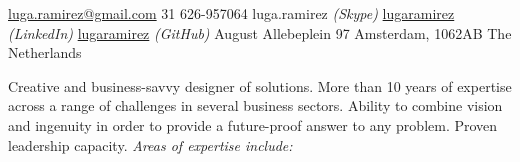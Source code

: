 \documentclass[10pt,a4paper]{article} %
\begin{document}
 



\noindent\href{mailto:luga.ramirez@gmail.com}{luga.ramirez@gmail.com}
\bull \textsmaller{+}31 626-957064
\bull luga.ramirez \textit{(Skype)}
\bull \href{https://www.linkedin.com/in/lugaramirez/}{lugaramirez} \textit{(LinkedIn)}
\bull \href{https://github.com/lugaramirez}{lugaramirez} \textit{(GitHub)}
\bull August Allebeplein 97
\bull Amsterdam, 1062AB
\bull The Netherlands %

\spacedhrule{0.9em}{-0.4em} %



Creative and business-savvy designer of solutions. More than 10 years of expertise across a range of challenges in several business sectors. Ability to combine vision and ingenuity in order to provide a future-proof answer to any problem. Proven leadership capacity. \textit{Areas of expertise include:}

\vspace{-1em} %
\begin{multicols}{2}  %
{}
\end{multicols}
\end{document}
